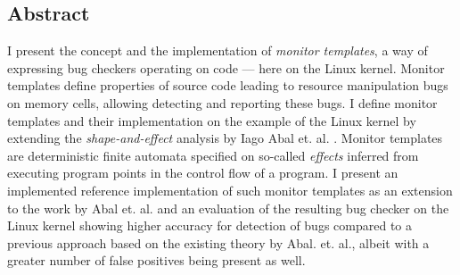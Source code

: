 \subsection*{Abstract}

I present the concept and the implementation of \emph{monitor templates}, a way of expressing bug checkers operating on code --- here on the Linux kernel. Monitor templates define properties of source code leading to resource manipulation bugs on memory cells, allowing detecting and reporting these bugs. I define monitor templates and their implementation on the example of the Linux kernel by extending the \textit{shape-and-effect} analysis by Iago Abal et. al. \cite{Abal2017EffectiveBF}. Monitor templates are deterministic finite automata specified on so-called \textit{effects} inferred from executing program points in the control flow of a program. I present an implemented reference implementation of such monitor templates as an extension to the work by Abal et. al. and an evaluation of the resulting bug checker on the Linux kernel showing higher accuracy for detection of bugs compared to a previous approach based on the existing theory by Abal. et. al.\cite{research-project}, albeit with a greater number of false positives being present as well.  